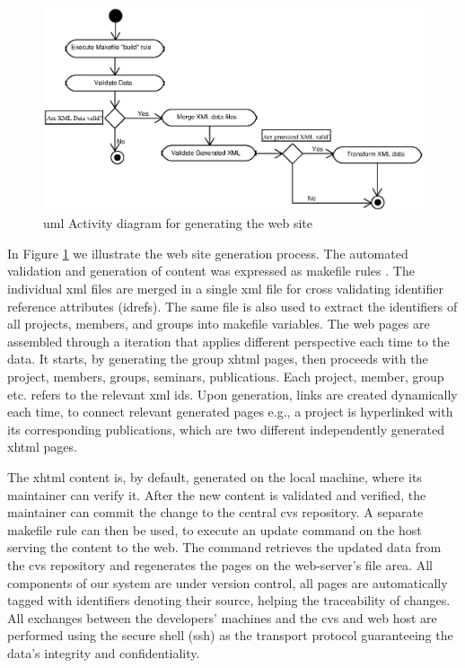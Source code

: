 \documentclass{elsart}
\begin{document}
\begin{figure}[h!]
\includegraphics[scale=0.6]{generate-web-site}
\caption{{\sc uml} Activity diagram for generating the web site}
\label{fig:generate-web-site}
\end{figure}

In Figure \ref{fig:generate-web-site} we illustrate the web site generation process.
The automated validation and generation of content was
expressed as makefile rules \cite{OTT91}.
The individual {\sc xml} files are merged in a
single {\sc xml} file for cross validating identifier
reference attributes ({\sc idref}s).
The same file is also used to extract the identifiers of
all projects, members, and groups into makefile
variables.
The web pages are assembled through a iteration that applies different perspective each time
to the data. It starts, by generating the group {\sc xhtml} pages, then proceeds with the project, members, groups, seminars, publications.
Each project, member, group etc. refers to the relevant {\sc xml id}s.
Upon generation, links are created dynamically each time, to
connect relevant generated pages e.g., a project is hyperlinked with its corresponding publications,
which are two different independently generated {\sc xhtml} pages.

The {\sc xhtml} content is, by default, generated on the
local machine, where its maintainer can verify it.
After the new content is validated and verified,
the maintainer can commit the change to the central {\sc cvs} repository. 
A separate makefile rule can then be used,
to execute an update command on the
host serving the content to the web.
The command retrieves the updated data from the {\sc cvs}
repository and regenerates the pages on the web-server's
file area.
All components of our system are under version control,
all pages are automatically tagged with identifiers
denoting their source, helping the traceability of changes.
All exchanges between the developers' machines and the
{\sc cvs} and web host are performed using the secure
shell ({\sc ssh}) as the transport protocol guaranteeing the data's integrity
and confidentiality.
\end{document}
